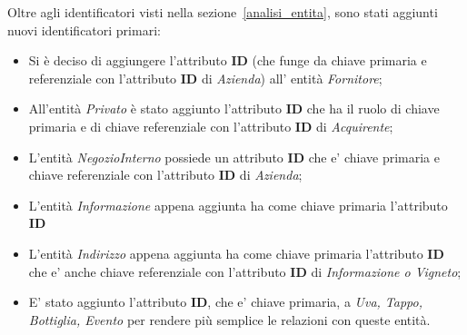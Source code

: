 Oltre agli identificatori visti nella sezione~\ref{analisi_entita}, sono stati aggiunti nuovi identificatori primari:

\begin{itemize}
	\item Si è deciso di aggiungere l'attributo \textbf{ID} (che funge da chiave primaria e referenziale con l'attributo \textbf{ID} di \emph{Azienda}) all' entità \emph{Fornitore};
	\item All'entità \emph{Privato} è stato aggiunto l'attributo \textbf{ID} che ha il ruolo di chiave primaria e di chiave referenziale con l'attributo \textbf{ID} di \emph{Acquirente};
	\item L'entità \emph{NegozioInterno} possiede un attributo \textbf{ID} che e' chiave primaria e chiave referenziale con l'attributo \textbf{ID} di \emph{Azienda};
	\item L'entità \emph{Informazione} appena aggiunta ha come chiave primaria l'attributo \textbf{ID}
	\item L'entità \emph{Indirizzo} appena aggiunta ha come chiave primaria l'attributo \textbf{ID} che e' anche chiave referenziale con l'attributo \textbf{ID} di \emph{Informazione o Vigneto};
	\item E' stato aggiunto l'attributo \textbf{ID}, che e' chiave primaria, a \emph{Uva, Tappo, Bottiglia, Evento} per rendere più semplice le relazioni con queste entità.
\end{itemize}